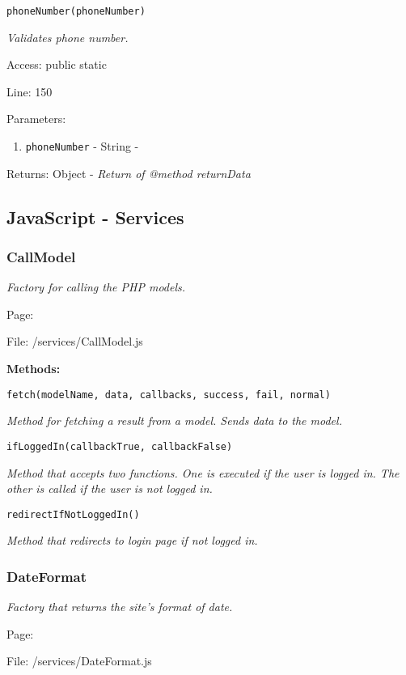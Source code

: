 \texttt{phoneNumber(phoneNumber)}

{\scriptsize
\textit{Validates phone number.}

Access: public static

Line: 150

Parameters:

\begin{enumerate}
\item \texttt{phoneNumber} - String - \textit{}
\end{enumerate}
Returns: Object - \textit{Return of @method returnData}

}

\subsection{JavaScript - Services}
\subsubsection{CallModel}\label{CallModel.js.doc}
\textit{Factory for calling the PHP models.}

Page: \pageref{CallModel.js}

File: /services/CallModel.js

\textbf{Methods:}

\texttt{fetch(modelName, data, callbacks, success, fail, normal)}

{\scriptsize
\textit{Method for fetching a result from a model.
Sends data to the model.}

}

\texttt{ifLoggedIn(callbackTrue, callbackFalse)}

{\scriptsize
\textit{Method that accepts two functions.
One is executed if the user is logged in.
The other is called if the user is not logged in.}

}

\texttt{redirectIfNotLoggedIn()}

{\scriptsize
\textit{Method that redirects to login page if not logged in.}

}

\subsubsection{DateFormat}\label{DateFormat.js.doc}
\textit{Factory that returns the site's format of date.}

Page: \pageref{DateFormat.js}

File: /services/DateFormat.js

